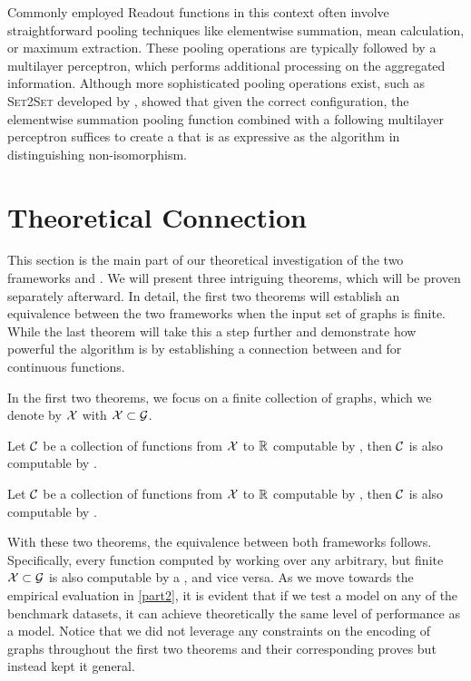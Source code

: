 Commonly employed \textsf{Readout} functions in this context often involve straightforward pooling techniques like elementwise summation, mean calculation, or maximum extraction. These pooling operations are typically followed by a multilayer perceptron, which performs additional processing on the aggregated information. Although more sophisticated pooling operations exist, such as \textsc{Set2Set} developed by \cite{Vinyals2015}, \cite{Xu2018} showed that given the correct configuration, the elementwise summation pooling function combined with a following multilayer perceptron suffices to create a \gnn that is as expressive as the \wl algorithm in distinguishing non-isomorphism.

\section{Theoretical Connection}\label{sec:theo_connections}
This section is the main part of our theoretical investigation of the two frameworks \wlnn and \gnn. We will present three intriguing theorems, which will be proven separately afterward. In detail, the first two theorems will establish an equivalence between the two frameworks when the input set of graphs is finite. While the last theorem will take this a step further and demonstrate how powerful the \wl algorithm is by establishing a connection between \wlnn and \gnn for continuous functions.

In the first two theorems, we focus on a finite collection of graphs, which we denote by $\mathcal{X}$ with $\mathcal{X} \subset \mathcal{G}$.
\begin{theorem}\label{theorem:gnn_in_1wl}
    Let $\mathcal{C}$ be a collection of functions from $\mathcal{X}$ to $\mathbb{R}$ computable by \gnns, then $\mathcal{C}$ is also computable by \wlnn.
\end{theorem}

\begin{theorem}\label{theorem:1wl_in_gnn}
    Let $\mathcal{C}$ be a collection of functions from $\mathcal{X}$ to $\mathbb{R}$ computable by \wlnn, then $\mathcal{C}$ is also computable by \gnns.
\end{theorem}
With these two theorems, the equivalence between both frameworks follows. Specifically, every function computed by \wlnn working over any arbitrary, but finite $\mathcal{X} \subset \mathcal{G}$ is also computable by a \gnn, and vice versa. As we move towards the empirical evaluation in \cref{part2}, it is evident that if we test a \wlnn model on any of the benchmark datasets, it can achieve theoretically the same level of performance as a \gnn model. Notice that we did not leverage any constraints on the encoding of graphs throughout the first two theorems and their corresponding proves but instead kept it general.

